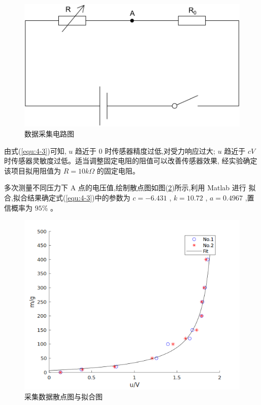 \begin{figure}[!ht]
  \centering
  \includegraphics[scale=0.4]{chapter04/pic/4-3}
  \caption{数据采集电路图}
  \label{fig:4-3}
  \vspace{-0.3cm}
\end{figure}

由式(\ref{equ:4-3})可知, $u$ 趋近于 0 时传感器精度过低,对受力响应过大;
$u$ 趋近于 $cV$ 时传感器灵敏度过低。适当调整固定电阻的阻值可以改善传感器效果,
经实验确定该项目拟用阻值为 $R=10k\Omega$ 的固定电阻。

多次测量不同压力下 A 点的电压值,绘制散点图如图(\ref{fig:4-4})所示,利用 Matlab 进行
拟合,拟合结果确定式(\ref{equ:4-3})中的参数为
$c = − 6.431$ , $ k = 10.72 $ , $a = 0.4967$ ,置信概率为 $95\%$ 。

\begin{figure}[!ht]
  \centering
  \includegraphics[scale=0.57]{chapter04/pic/4-4}
  \caption{采集数据散点图与拟合图}
  \label{fig:4-4}
  \vspace{-0.3cm}
\end{figure}

